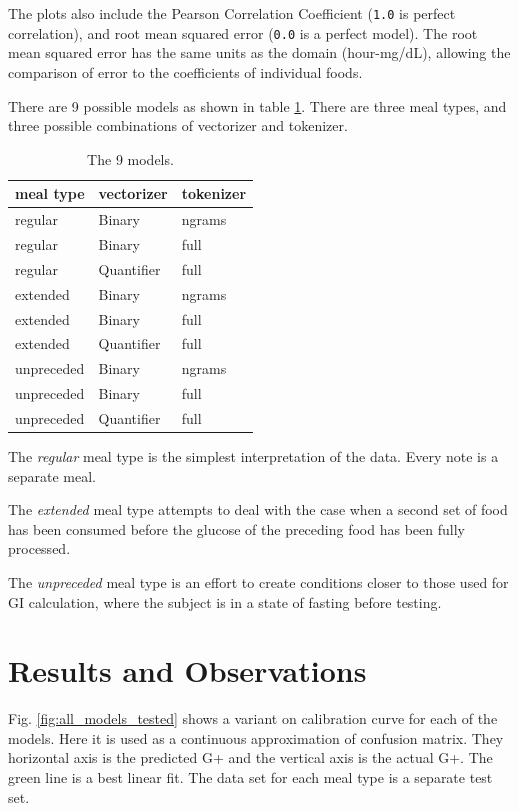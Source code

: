 \documentclass[conference]{IEEEtran}
\begin{document}
The plots also include the Pearson Correlation Coefficient (\texttt{1.0} is perfect correlation), and root mean squared error (\texttt{0.0} is a perfect model). The root mean squared error has the same units as the domain (hour-mg/dL), allowing the comparison of error to the coefficients of individual foods.

There are 9 possible models as shown in table \ref{table:models}. There are three meal types, and three possible combinations of vectorizer and tokenizer.

\begin{table}
\centering
\begin{tabular}[tbp]{|l l l|}
    \hline
    meal type   & vectorizer & tokenizer \\
    \hline
    regular     & Binary     & ngrams \\
    regular     & Binary     & full \\
    regular     & Quantifier & full \\
    extended    & Binary     & ngrams \\
    extended    & Binary     & full \\
    extended    & Quantifier & full \\
    unpreceded & Binary     & ngrams \\
    unpreceded & Binary     & full \\
    unpreceded & Quantifier & full \\
    \hline
\end{tabular}
\caption{The 9 models. \label{table:models}}
\end{table}

The \emph{regular} meal type is the simplest interpretation of the data. Every note is a separate meal.

The \emph{extended} meal type attempts to deal with the case when a second set of food has been consumed before the glucose of the preceding food has been fully processed.

The \emph{unpreceded} meal type is an effort to create conditions closer to those used for GI calculation, where the subject is in a state of fasting before testing.

\section{Results and Observations}

Fig. \ref{fig:all_models_tested} shows a variant on calibration curve for each of the models. Here it is used as a continuous approximation of confusion matrix. They horizontal axis is the predicted G+ and the vertical axis is the actual G+. The green line is a best linear fit. The data set for each meal type is a separate test set.
\end{document}
